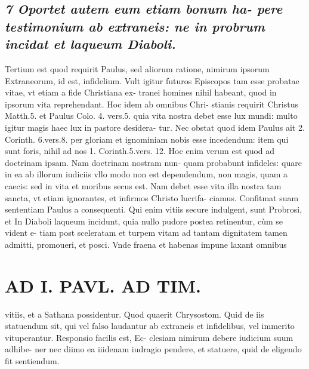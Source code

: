 \documentclass{article}
\begin{document}
\begin{pages}
\subsection*{\textit{7 Oportet autem eum etiam bonum ha- pere testimonium ab extraneis: ne in probrum incidat et laqueum Diaboli. }}\pstart Tertium est quod requirit Paulus, sed aliorum ratione, nimirum ipsorum Extraneorum, id est, infidelium. Vult igitur futuros Episcopos tam esse probatae vitae, vt etiam a fide Christiana ex- tranei homines nihil habeant, quod in ipsorum vita reprehendant. Hoc idem ab omnibus Chri- stianis requirit Christus Matth.5. et Paulus Colo. 4. vers.5. quia vita nostra debet esse lux mundi: multo igitur magis haec lux in pastore desidera- tur. Nec obstat quod idem Paulus ait 2. Corinth. 6.vers.8. per gloriam et ignominiam nobis esse incedendum: item qui sunt foris, nihil ad nos 1. Corinth.5.vers. 12. Hoc enim verum est quod ad doctrinam ipsam. Nam doctrinam nostram nun- quam probabunt infideles: quare in ea ab illorum iudiciis vllo modo non est dependendum, non magis, quam a caecis: sed in vita et moribus secus est. Nam debet esse vita illa nostra tam sancta, vt etiam ignorantes, et infirmos Christo lucrifa- ciamus. Confitmat suam sententiam Paulus a consequenti. Qui enim vitiis secure indulgent, sunt Probrosi, et In Diaboli laqueum incidunt, quia nullo pudore postea retinentur, cùm se vident e- tiam post sceleratam et turpem vitam ad tantam dignitatem tamen admitti, promoueri, et posci. Vnde fraena et habenas impune laxant omnibus  \pend
\section*{AD I. PAVL. AD TIM. }
\marginpar{[ p.20.  ]}\pstart vitiis, et a Sathana possidentur. Quod quaerit Chrysostom. Quid de iis statuendum sit, qui vel falso laudantur ab extraneis et infidelibus, vel immerito vituperantur. Responsio facilis est, Ec- clesiam nimirum debere iudicium suum adhibe- ner nec diimo ea iiidenam iudragio pendere, et statuere, quid de eligendo fit sentiendum.  \pend
{}
{}

\end{pages}
\end{document}
